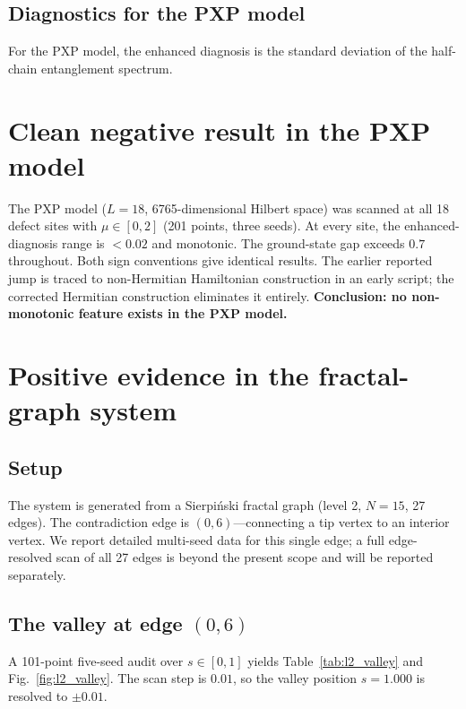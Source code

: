 \documentclass[aps,prb,reprint,superscriptaddress]{revtex4-2}
\begin{document}
\subsection{Diagnostics for the PXP model}

For the PXP model, the enhanced diagnosis is the standard deviation of the half-chain entanglement spectrum.

\section{Clean negative result in the PXP model}

The PXP model ($L=18$, 6765-dimensional Hilbert space) was scanned at all 18 defect sites with $\mu\in[0,2]$ (201 points, three seeds). At every site, the enhanced-diagnosis range is $<0.02$ and monotonic. The ground-state gap exceeds $0.7$ throughout. Both sign conventions give identical results. The earlier reported jump is traced to non-Hermitian Hamiltonian construction in an early script; the corrected Hermitian construction eliminates it entirely. \textbf{Conclusion: no non-monotonic feature exists in the PXP model.}

\section{Positive evidence in the fractal-graph system}

\subsection{Setup}

The system is generated from a Sierpi\'{n}ski fractal graph (level 2, $N=15$, 27 edges). The contradiction edge is $(0,6)$---connecting a tip vertex to an interior vertex. We report detailed multi-seed data for this single edge; a full edge-resolved scan of all 27 edges is beyond the present scope and will be reported separately.

\subsection{The valley at edge $(0,6)$}

A 101-point five-seed audit over $s\in[0,1]$ yields Table~\ref{tab:l2_valley} and Fig.~\ref{fig:l2_valley}. The scan step is $0.01$, so the valley position $s=1.000$ is resolved to $\pm0.01$.
\end{document}

